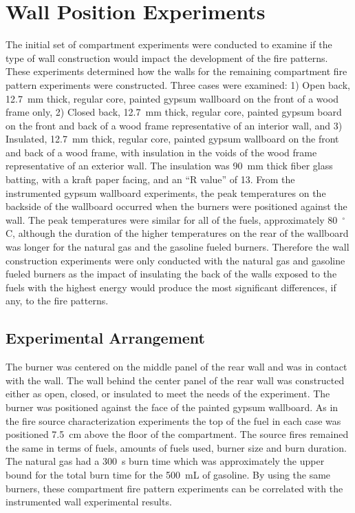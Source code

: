 \documentclass[twoside]{uocthesis}
\begin{document}
{\section{Wall Position Experiments}

 The initial set of compartment experiments were conducted to examine if the type of wall construction would impact the development of the fire patterns. These experiments determined how the walls for the remaining compartment fire pattern experiments were constructed.  Three cases were examined: 1) Open back, 12.7~mm thick, regular core, painted gypsum wallboard on the front of a wood frame only, 2) Closed back, 12.7~mm thick, regular core, painted gypsum board on the front and back of a wood frame representative of an interior wall, and 3) Insulated, 12.7~mm thick, regular core, painted gypsum wallboard on the front and back of a wood frame, with insulation in the voids of the wood frame representative of an exterior wall. The insulation was 90~mm thick fiber glass batting, with a kraft paper facing, and an ``R value'' of 13.  From the instrumented gypsum wallboard experiments, the peak temperatures on the backside of the wallboard occurred when the burners were positioned against the wall.  The peak temperatures were similar for all of the fuels, approximately 80~$^\circ$C, although the duration of the higher temperatures on the rear of the wallboard was longer for the natural gas and the gasoline fueled burners. Therefore the wall construction experiments were only conducted with the natural gas and gasoline fueled burners as the impact of insulating the back of the walls exposed to the fuels with the highest energy would produce the most significant differences, if any, to the fire patterns.


\subsection{Experimental Arrangement}

The burner was centered on the middle panel of the rear wall and was in contact with the wall. The wall behind the center panel of the rear wall was constructed either as open, closed, or insulated to meet the needs of the experiment. The burner was positioned against the face of the painted gypsum wallboard. As in the fire source characterization experiments the top of the fuel in each case was positioned 7.5~cm above the floor of the compartment. The source fires remained the same in terms of fuels, amounts of fuels used, burner size and burn duration.  The natural gas had a 300~s burn time which was approximately the upper bound for the total burn time for the 500~mL of gasoline.  By using the same burners, these compartment fire pattern experiments can be correlated with the instrumented wall experimental results.

}
\end{document}
